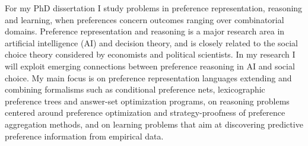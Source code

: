 For my PhD dissertation I study problems in preference representation, 
reasoning and learning, when preferences concern outcomes ranging over
combinatorial domains.
Preference representation and reasoning is a major research 
area in artificial intelligence (AI) and decision theory, and is closely related to the 
social choice theory considered by economists and political scientists. In my research I 
will exploit emerging connections between preference reasoning in AI and social choice. 
My main focus is on preference representation languages extending and combining
formalisms such as conditional preference nets, lexicographic preference trees and answer-set 
optimization programs, on reasoning problems centered around preference optimization 
and strategy-proofness of preference aggregation methods, and on
learning problems that aim at discovering predictive preference information
from empirical data.
